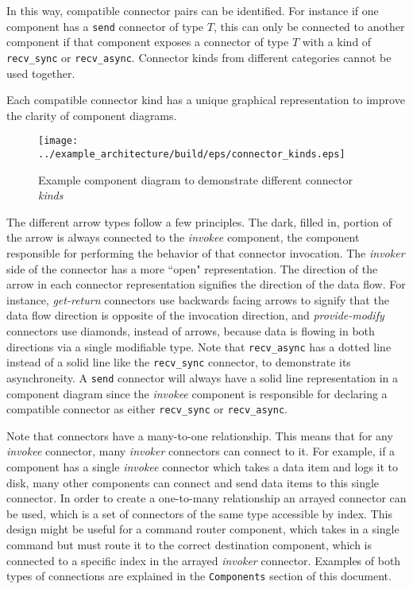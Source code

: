 In this way, compatible connector pairs can be identified. For instance if one component has a \texttt{send} connector of type $T$, this can only be connected to another component if that component exposes a connector of type $T$ with a kind of \texttt{recv\_sync} or \texttt{recv\_async}. Connector kinds from different categories cannot be used together.

Each compatible connector kind has a unique graphical representation to improve the clarity of component diagrams.

\begin{figure}[H]
  \texttt{[image: ../example\_architecture/build/eps/connector\_kinds.eps]}
  \caption{Example component diagram to demonstrate different connector \textit{kinds}}
\end{figure}

The different arrow types follow a few principles. The dark, filled in, portion of the arrow is always connected to the \textit{invokee} component, the component responsible for performing the behavior of that connector invocation. The \textit{invoker} side of the connector has a more ``open" representation. The direction of the arrow in each connector representation signifies the direction of the data flow. For instance, \textit{get-return} connectors use backwards facing arrows to signify that the data flow direction is opposite of the invocation direction, and \textit{provide-modify} connectors use diamonds, instead of arrows, because data is flowing in both directions via a single modifiable type. Note that \texttt{recv\_async} has a dotted line instead of a solid line like the \texttt{recv\_sync} connector, to demonstrate its asynchroneity. A \texttt{send} connector will always have a solid line representation in a component diagram since the \textit{invokee} component is responsible for declaring a compatible connector as either \texttt{recv\_sync} or \texttt{recv\_async}.

Note that connectors have a many-to-one relationship. This means that for any \textit{invokee} connector, many \textit{invoker} connectors can connect to it. For example, if a component has a single \textit{invokee} connector which takes a data item and logs it to disk, many other components can connect and send data items to this single connector. In order to create a one-to-many relationship an arrayed connector can be used, which is a set of connectors of the same type accessible by index. This design might be useful for a command router component, which takes in a single command but must route it to the correct destination component, which is connected to a specific index in the arrayed \textit{invoker} connector. Examples of both types of connections are explained in the \texttt{Components} section of this document.

